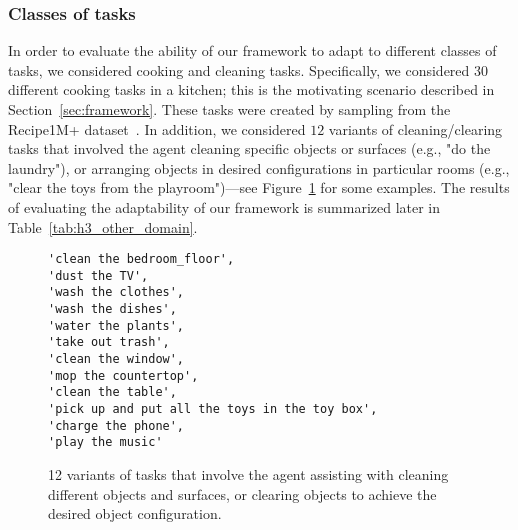 \subsubsection{Classes of tasks}
In order to evaluate the ability of our framework to adapt to different classes of tasks, we considered cooking and cleaning tasks. Specifically, we considered $30$ different cooking tasks in a kitchen; this is the motivating scenario described in Section~\ref{sec:framework}. These tasks were created by sampling from the Recipe1M+ dataset~\cite{marin2021recipe1m+}. In addition, we considered $12$ variants of cleaning/clearing tasks that involved the agent cleaning specific objects or surfaces (e.g., "do the laundry"), or arranging objects in desired configurations in particular rooms (e.g., "clear the toys from the playroom")---see Figure~\ref{fig:12} for some examples.
The results of evaluating the adaptability of our framework is summarized later in Table~\ref{tab:h3_other_domain}.

\begin{figure}[tb]
\captionsetup{font=scriptsize}
\centering
    \begin{minipage}{0.45\textwidth}
        \begin{lstlisting}[basicstyle=\ttfamily\scriptsize]
'clean the bedroom_floor',
'dust the TV',
'wash the clothes',
'wash the dishes',
'water the plants',
'take out trash',
'clean the window',
'mop the countertop',
'clean the table',
'pick up and put all the toys in the toy box',
'charge the phone',
'play the music'
        \end{lstlisting}
    \end{minipage}
    \setlength{\abovecaptionskip}{-2pt}
    \setlength{\belowcaptionskip}{-12pt}
    \caption{12 variants of tasks that involve the agent assisting with cleaning different objects and surfaces, or clearing objects to achieve the desired object configuration.}
    \label{fig:12}
\end{figure}



